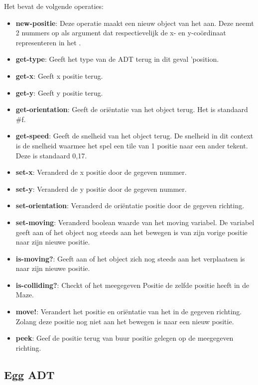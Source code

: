 Het \texttt{} bevat de volgende operaties:

\begin{itemize}
	\item \textbf{new-positie}: Deze operatie maakt een nieuw object van het \texttt{} aan. 
		Deze neemt 2 nummers op als argument
		dat respectievelijk de x- en y-co\"ordinaat representeren in het \texttt{}.
	\item \textbf{get-type}: Geeft het type van de ADT terug in dit geval 'position.
	\item \textbf{get-x}: Geeft x positie terug.
	\item \textbf{get-y}: Geeft y positie terug.
	\item \textbf{get-orientation}: Geeft de oriëntatie van het object terug.
		Het is standaard \#f.
	\item \textbf{get-speed}: Geeft de snelheid van het object terug.
		De snelheid in dit context is 
		de snelheid waarmee het spel een tile van 1 positie naar een ander tekent.
		Deze is standaard 0,17.
	\item \textbf{set-x}: Veranderd de x positie door de gegeven nummer.
	\item \textbf{set-y}: Veranderd de y positie door de gegeven nummer.
	\item \textbf{set-orientation}: Veranderd de oriëntatie positie door de gegeven richting.
	\item \textbf{set-moving}: Veranderd boolean waarde van het moving variabel.
		De variabel geeft aan of het object nog steeds aan het bewegen is van zijn vorige positie naar zijn nieuwe positie.
	\item \textbf{is-moving?}: Geeft aan of het object zich nog steeds aan het verplaatsen is naar zijn nieuwe positie.
	\item \textbf{is-colliding?}: Checkt of het meegegeven Positie de zelfde positie heeft in de Maze.
	\item \textbf{move!}: Verandert het positie en oriëntatie van het \texttt{} in de gegeven richting.
		Zolang deze positie nog niet aan het bewegen is naar een nieuw positie.
	\item \textbf{peek}: Geef de positie terug van buur positie gelegen op de meegegeven richting.
\end{itemize}

\subsection{Egg ADT}
\label{section:egg}

